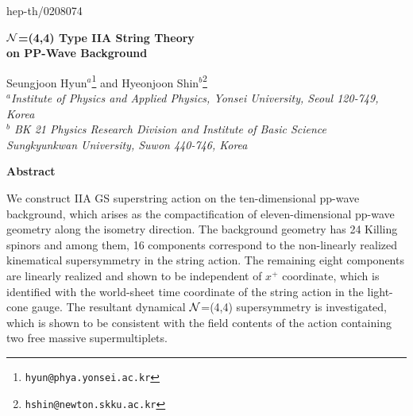 \documentclass[a4paper,12pt]{article}
\begin{document}
\renewcommand{\thefootnote}{\fnsymbol{footnote}}

\begin{titlepage}
\hfill{hep-th/0208074}
\vspace{15mm}
\baselineskip 8mm

\begin{center}
{\LARGE \bf ${\cal N}$=(4,4) Type IIA String Theory \\
on PP-Wave Background }
\end{center}
\baselineskip 6mm
\vspace{10mm}
\begin{center}
Seungjoon Hyun$^a$\footnote{\tt hyun@phya.yonsei.ac.kr} and
Hyeonjoon Shin$^b$\footnote{\tt hshin@newton.skku.ac.kr} \\[5mm]
{\it
$^a$Institute of Physics and Applied Physics, Yonsei University,
Seoul 120-749, Korea \\
$^b$ BK 21 Physics Research Division and Institute of Basic Science \\
Sungkyunkwan University, Suwon 440-746, Korea}
\end{center}

\thispagestyle{empty}


\vfill

\begin{center}
{\bf Abstract}
\end{center}
\noindent 
We construct IIA GS superstring action on the ten-dimensional pp-wave
background, which arises as the compactification of eleven-dimensional
pp-wave geometry along the isometry direction. The background geometry
has 24 Killing spinors and among them, 16 components correspond to the
non-linearly realized kinematical supersymmetry in the string
action. The remaining eight components are linearly realized and shown
to be independent of $x^+$ coordinate, which is identified with the
world-sheet time coordinate of the string action in the light-cone
gauge. The resultant dynamical $\cal{N}$=(4,4) supersymmetry is
investigated, which is shown to be consistent with the field contents
of the action containing two free massive supermultiplets.
\vspace{20mm}
\end{titlepage}
\end{document}
